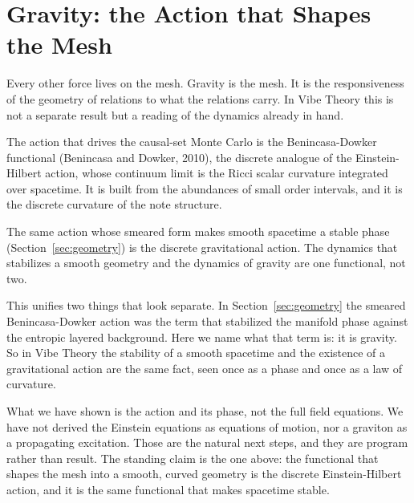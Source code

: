 \section{Gravity: the Action that Shapes the Mesh}
\label{sec:gravity}

Every other force lives on the mesh. Gravity is the mesh. It is the responsiveness of the geometry of relations to what the relations carry. In Vibe Theory this is not a separate result but a reading of the dynamics already in hand.

The action that drives the causal-set Monte Carlo is the Benincasa-Dowker functional (Benincasa and Dowker, 2010), the discrete analogue of the Einstein-Hilbert action, whose continuum limit is the Ricci scalar curvature integrated over spacetime. It is built from the abundances of small order intervals, and it is the discrete curvature of the note structure.

\begin{principle}
The same action whose smeared form makes smooth spacetime a stable phase (Section~\ref{sec:geometry}) is the discrete gravitational action. The dynamics that stabilizes a smooth geometry and the dynamics of gravity are one functional, not two.
\end{principle}

This unifies two things that look separate. In Section~\ref{sec:geometry} the smeared Benincasa-Dowker action was the term that stabilized the manifold phase against the entropic layered background. Here we name what that term is: it is gravity. So in Vibe Theory the stability of a smooth spacetime and the existence of a gravitational action are the same fact, seen once as a phase and once as a law of curvature.

What we have shown is the action and its phase, not the full field equations. We have not derived the Einstein equations as equations of motion, nor a graviton as a propagating excitation. Those are the natural next steps, and they are program rather than result. The standing claim is the one above: the functional that shapes the mesh into a smooth, curved geometry is the discrete Einstein-Hilbert action, and it is the same functional that makes spacetime stable.
